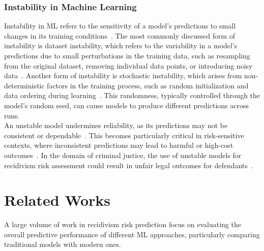 \documentclass[12pt]{article}
\begin{document}
\subsubsection{Instability in Machine Learning}
\tab Instability in ML refers to the sensitivity of a model's predictions to small changes in its training conditions~\cite{sun2015stability}. The most commonly discussed form of instability is dataset instability, which refers to the variability in a model's predictions due to small perturbations in the training data, such as resampling from the original dataset, removing individual data points, or introducing noisy data~\cite{riley2023stability,hardt2016train}. Another form of instability is stochastic instability, which arises from non-deterministic factors in the training process, such as random initialization and data ordering during learning~\cite{lopez2022instability}. This randomness, typically controlled through the model's random seed, can cause models to produce different predictions across runs.\\

An unstable model undermines reliability, as its predictions may not be consistent or dependable~\cite{riley2023stability}. This becomes particularly critical in risk-sensitive contexts, where inconsistent predictions may lead to harmful or high-cost outcomes~\cite{zhang2024reliability}. In the domain of criminal justice, the use of unstable models for recidivism risk assessment could result in unfair legal outcomes for defendants~\cite{greene2022forks}.



\section{Related Works}
\tab A large volume of work in recidivism risk prediction focus on evaluating the overall predictive performance of different ML approaches, particularly comparing traditional models with modern ones.\\
\end{document}
